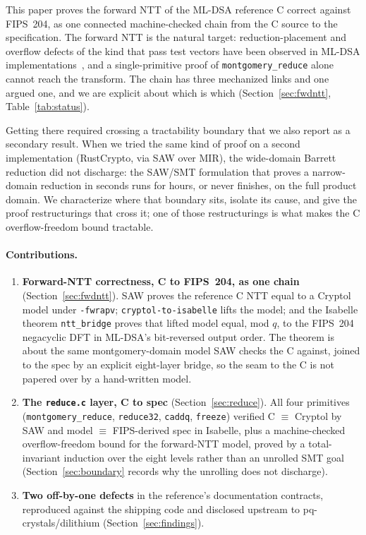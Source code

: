 \documentclass[journal=tches,submission,review]{iacrtrans}
\newcommand{\code}[1]{\texttt{#1}}
\begin{document}
This paper proves the forward NTT of the ML-DSA reference C correct against FIPS~204, as one connected
machine-checked chain from the C source to the specification. The forward NTT is the natural target:
reduction-placement and overflow defects of the kind that pass test vectors have been observed in ML-DSA
implementations~\cite{eprint1032}, and a single-primitive proof of \code{montgomery\_reduce} alone cannot
reach the transform. The chain has three
mechanized links and one argued one, and we are explicit about which is which (Section~\ref{sec:fwdntt},
Table~\ref{tab:status}).

Getting there required crossing a tractability boundary that we also report as a secondary result. When
we tried the same kind of proof on a second implementation (RustCrypto, via SAW over MIR), the
wide-domain Barrett reduction did not discharge: the SAW/SMT formulation that proves a narrow-domain
reduction in seconds runs for hours, or never finishes, on the full product domain. We characterize
where that boundary sits, isolate its cause, and give the proof restructurings that cross it; one of
those restructurings is what makes the C overflow-freedom bound tractable.

\paragraph{Contributions.}
\begin{enumerate}
  \item \textbf{Forward-NTT correctness, C to FIPS~204, as one chain} (Section~\ref{sec:fwdntt}). SAW
  proves the reference C NTT equal to a Cryptol model under \code{-fwrapv}; \code{cryptol-to-isabelle}
  lifts the model; and the Isabelle theorem \code{ntt\_bridge} proves that lifted model equal, mod $q$,
  to the FIPS~204 negacyclic DFT in ML-DSA's bit-reversed output order. The theorem is about the same
  montgomery-domain model SAW checks the C against, joined to the spec by an explicit eight-layer bridge,
  so the seam to the C is not papered over by a hand-written model.
  \item \textbf{The \code{reduce.c} layer, C to spec} (Section~\ref{sec:reduce}). All four primitives
  (\code{montgomery\_reduce}, \code{reduce32}, \code{caddq}, \code{freeze}) verified C $\equiv$ Cryptol by
  SAW and model $\equiv$ FIPS-derived spec in Isabelle, plus a machine-checked overflow-freedom bound for
  the forward-NTT model, proved by a total-invariant induction over the eight levels rather than an
  unrolled SMT goal (Section~\ref{sec:boundary} records why the unrolling does not discharge).
  \item \textbf{Two off-by-one defects} in the reference's documentation contracts, reproduced against
  the shipping code and disclosed upstream to pq-crystals/dilithium (Section~\ref{sec:findings}).
\end{enumerate}
\end{document}
